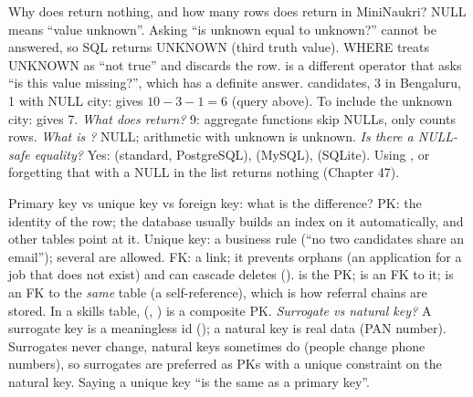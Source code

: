 \begin{qa}{\classic Why does  return nothing, and how many rows does  return in MiniNaukri?}
\why NULL means ``value unknown''. Asking ``is unknown equal to unknown?'' cannot be answered, so SQL returns UNKNOWN (third truth value). WHERE treats
UNKNOWN as ``not true'' and discards the row.  is a different operator that asks ``is this value missing?'', which has a definite answer.
 candidates, 3 in Bengaluru, 1 with NULL city:  gives $10 - 3 - 1 = 6$ (query  above).
To include the unknown city:  gives 7.
\pushes \emph{What does  return?} 9: aggregate functions skip NULLs, only  counts rows. \emph{What is
?} NULL; arithmetic with unknown is unknown. \emph{Is there a NULL-safe equality?} Yes:  (standard,
PostgreSQL), \code{<=>} (MySQL),  (SQLite).
\pitfall Using , or forgetting that  with a NULL in the list returns nothing (Chapter 47).
\end{qa}

\begin{qa}{\classic Primary key vs unique key vs foreign key: what is the difference?}
\why PK: the identity of the row; the database usually builds an index on it automatically, and other tables point at it. Unique key: a business rule
(``no two candidates share an email''); several are allowed. FK: a link; it prevents orphans (an application for a job that does not exist) and can
cascade deletes ().
\worked {} is the PK;  is an FK to it;  is an FK to the
\emph{same} table (a self-reference), which is how referral chains are stored. In a skills table, (, ) is a composite PK.
\pushes \emph{Surrogate vs natural key?} A surrogate key is a meaningless id (); a natural key is real data (PAN number). Surrogates
never change, natural keys sometimes do (people change phone numbers), so surrogates are preferred as PKs with a unique constraint on the natural key.
\pitfall Saying a unique key ``is the same as a primary key''.
\end{qa}

